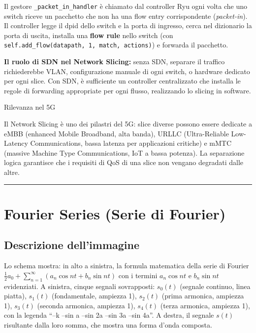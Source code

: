 \documentclass[
  italian,
  openany]{book}
\begin{document}
Il gestore \texttt{\_packet\_in\_handler} è chiamato dal controller Ryu
ogni volta che uno switch riceve un pacchetto che non ha una flow entry
corrispondente (\emph{packet-in}). Il controller legge il dpid dello
switch e la porta di ingresso, cerca nel dizionario la porta di uscita,
installa una \textbf{flow rule} nello switch (con
\texttt{self.add\_flow(datapath,\ 1,\ match,\ actions)}) e forwarda il
pacchetto.

\textbf{Il ruolo di SDN nel Network Slicing:} senza SDN, separare il
traffico richiederebbe VLAN, configurazione manuale di ogni switch, o
hardware dedicato per ogni slice. Con SDN, è sufficiente un controller
centralizzato che installa le regole di forwarding appropriate per ogni
flusso, realizzando lo slicing in software.

\begin{callouttip}{Rilevanza nel 5G}

Il Network Slicing è uno dei pilastri del 5G: slice diverse possono
essere dedicate a eMBB (enhanced Mobile Broadband, alta banda), URLLC
(Ultra-Reliable Low-Latency Communications, bassa latenza per
applicazioni critiche) e mMTC (massive Machine Type Communications, IoT
a bassa potenza). La separazione logica garantisce che i requisiti di
QoS di una slice non vengano degradati dalle altre.

\end{callouttip}

\begin{center}\rule{0.5\linewidth}{0.5pt}\end{center}

\section{Fourier Series (Serie di
Fourier)}\label{fourier-series-serie-di-fourier}

\subsection{Descrizione
dell'immagine}\label{descrizione-dellimmagine-14}

Lo schema mostra: in alto a sinistra, la formula matematica della serie
di Fourier
\(\frac{1}{2}a_0 + \sum_{n=1}^{\infty}(a_n \cos nt + b_n \sin nt)\) con
i termini \(a_n \cos nt\) e \(b_n \sin nt\) evidenziati. A sinistra,
cinque segnali sovrapposti: \(s_0(t)\) (segnale continuo, linea piatta),
\(s_1(t)\) (fondamentale, ampiezza 1), \(s_2(t)\) (prima armonica,
ampiezza 1), \(s_3(t)\) (seconda armonica, ampiezza 1), \(s_4(t)\)
(terza armonica, ampiezza 1), con la legenda ``--k --sin a --sin 2a
--sin 3a --sin 4a''. A destra, il segnale \(s(t)\) risultante dalla loro
somma, che mostra una forma d'onda composta.
\end{document}
